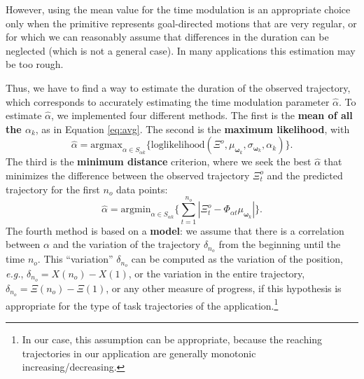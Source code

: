 \documentclass[utf8]{frontiersSCNS} %
\newcommand{\todo}[1]{\textcolor{red}{\textbf{/*#1*/}}}
\begin{document}
However, using the mean value for the time modulation is an appropriate choice only when the primitive represents goal-directed motions that are very regular, or for which we can reasonably assume that differences in the duration can be neglected (which is not a general case). In many applications this estimation may be too rough.

Thus, we have to find a way to estimate the duration of the observed trajectory, which corresponds to accurately estimating the time modulation parameter $\hat{\alpha}$.
To estimate $\hat{\alpha}$, we implemented four different methods.
The first is the \textbf{mean of all the $\alpha_k$}, as in Equation \ref{eq:avg}. The second is
the \textbf{maximum likelihood}, with
\begin{equation}
\label{eq:ml}
\hat{\alpha} = \mathrm{argmax}_{\alpha \in S_{\alpha k}}\{\mathrm{loglikelihood}(\Xi^o,\mu_{\boldsymbol{\omega}_k}, \sigma_{\boldsymbol{\omega}_k}, \alpha_k)\} .
\end{equation} 
The third is the \textbf{minimum distance} criterion, where we seek the best $\hat{\alpha}$ that minimizes the difference between the observed trajectory $\Xi^o_t$ and the predicted trajectory for the first $n_o$ data points:
\begin{equation}
\label{eq:minDist}
\hat{\alpha} =\mathrm{argmin}_{\alpha \in S_{\alpha k}} \{\sum_{t=1}^{{n_o}} |\Xi^o_t - \Phi_{\alpha t} \mu_{\boldsymbol{\omega}_k}|\} .
\end{equation} 
The fourth method is based on a \textbf{model}:
we assume that there is a correlation between $\alpha$ and the variation of the trajectory $\delta_{n_o}$ from the beginning until the time $n_o$. This ``variation'' $\delta_{n_o}$ can be computed as the variation of the position, \textit{e.g.}, $\delta_{n_o} = X(n_o) - X(1)$, or the variation in the entire trajectory, $ \delta_{n_o} =\Xi(n_o) - \Xi(1)$, or any other measure of progress, if this hypothesis is appropriate for the type of task trajectories of the application.\footnote{In our case, this assumption can be appropriate, because the reaching trajectories in our application are generally monotonic increasing/decreasing.} 
\end{document}
